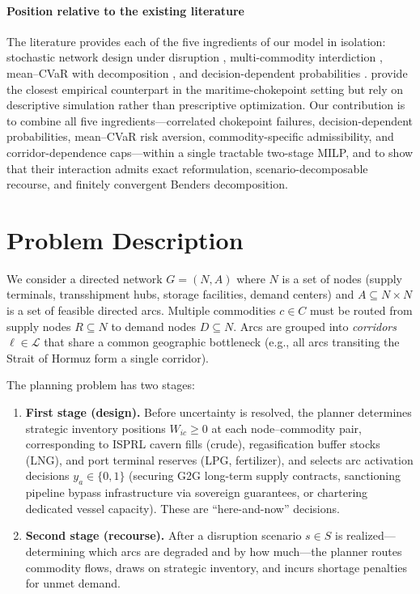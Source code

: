 \documentclass[final,3p,authoryear]{elsarticle}
\theoremstyle{definition}
\begin{document}
\paragraph{Position relative to the existing literature}
The literature provides each of the five ingredients of our model in isolation: stochastic network design under disruption \citep{snyder2005, lim2010, tolooie2020, fattahi2020}, multi-commodity interdiction \citep{vaziri2025}, mean--CVaR with decomposition \citep{noyan2012, ghaffarinasab2023}, and decision-dependent probabilities \citep{goel2006, hellemo2018, basciftci2021, bhuiyan2020}. \cite{verschuur2025} provide the closest empirical counterpart in the maritime-chokepoint setting but rely on descriptive simulation rather than prescriptive optimization. Our contribution is to combine all five ingredients—correlated chokepoint failures, decision-dependent probabilities, mean--CVaR risk aversion, commodity-specific admissibility, and corridor-dependence caps—within a single tractable two-stage MILP, and to show that their interaction admits exact reformulation, scenario-decomposable recourse, and finitely convergent Benders decomposition.

\section{Problem Description}
\label{sec:problem}

We consider a directed network $G = (N, A)$ where $N$ is a set of nodes
(supply terminals, transshipment hubs, storage facilities, demand centers)
and $A \subseteq N \times N$ is a set of feasible directed arcs. Multiple
commodities $c \in C$ must be routed from supply nodes $R \subseteq N$ to
demand nodes $D \subseteq N$. Arcs are grouped into \emph{corridors}
$\ell \in \mathcal{L}$ that share a common geographic bottleneck (e.g.,
all arcs transiting the Strait of Hormuz form a single corridor).

The planning problem has two stages:

\begin{enumerate}[leftmargin=2em]
    \item \textbf{First stage (design).} Before uncertainty is resolved,
    the planner determines strategic inventory positions $W_{ic} \ge 0$
    at each node--commodity pair, corresponding to ISPRL cavern
    fills (crude), regasification buffer stocks (LNG), and port
    terminal reserves (LPG, fertilizer), and selects arc activation
    decisions $y_a \in \{0,1\}$ (securing G2G long-term supply
    contracts, sanctioning pipeline bypass infrastructure via
    sovereign guarantees, or chartering dedicated vessel capacity).
    These are ``here-and-now'' decisions.
 

    \item \textbf{Second stage (recourse).} After a disruption scenario
    $s \in S$ is realized---determining which arcs are degraded and by how
    much---the planner routes commodity flows, draws on strategic
    inventory, and incurs shortage penalties for unmet demand.
\end{enumerate}
\end{document}
